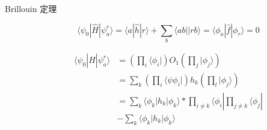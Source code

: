 \documentclass[12pt,a4paper,openany,twoside]{book}
\numberwithin{equation}{section}
\newcommand{\bra}[1]{\langle #1 |}
\newcommand{\ket}[1]{| #1 \rangle}
\newcommand{\bracketl}[3]{\langle #1 | #2 | #3 \rangle}
\begin{document}
\begin{description}
    \item[Brillouin 定理]
    \begin{equation}
    \bracketl{\psi_0}{\hat{H}}{\psi_a^r}=\bracketl{a}{\hat{h}}{r}+\sum_b\bra{ab}\ket{rb}=\bracketl{\phi_a}{\hat{f}}{\phi_r}=0
    \end{equation}
  
    \begin{align*}
    \bracketl{\psi_0}{\hat{H}}{\psi_a^r}&=(\prod_i\bra{\phi_i})O_1(\prod_j\ket{\phi_j})\\
    &=\sum_k(\prod_i\bra{\psi{\phi_i}})h_k(\prod_l\ket{\phi_j})\\
    &=\sum_k \bracketl{\phi_k}{h_k}{\phi_k}*\prod_{i \neq k} \bra{\phi_i} \prod_{j \neq k} \bra{\phi_j}\\
    &-\sum_k \bracketl{\phi_k}{h_k}{\phi_k}
    \end{align*}
  \end{description}
  
\end{document}
